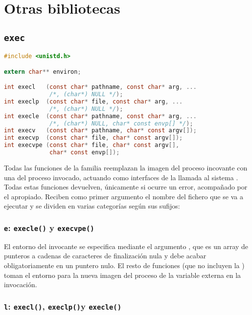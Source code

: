\chapter{Otras bibliotecas}

\section{\texttt{exec}}\label{exec}

\begin{lstlisting}[language=C]
#include <unistd.h>

extern char** environ;

int execl   (const char* pathname, const char* arg, ...
             /*, (char*) NULL */);
int execlp  (const char* file, const char* arg, ...
             /*, (char*) NULL */);
int execle  (const char* pathname, const char* arg, ...
             /*, (char*) NULL, char* const envp[] */);
int execv   (const char* pathname, char* const argv[]);
int execvp  (const char* file, char* const argv[]);
int execvpe (const char* file, char* const argv[],
             char* const envp[]);
\end{lstlisting}

Todas las funciones de la familia  reemplazan la imagen del proceso incovante con una del proceso invocado, actuando como interfaces de la llamada al sistema .
Todas estas funciones devuelven, únicamente si ocurre un error,  acompañado por el  apropiado.
Reciben como primer argumento el nombre del fichero que se va a ejecutar y se dividen en varias categorías según sus sufijos:

\subsection{\texttt{e}: \texttt{execle()} y \texttt{execvpe()}}

El entorno del invocante se especifica mediante el argumento , que es un array de punteros a cadenas de caracteres de finalización nula y debe acabar obligatoriamente en un puntero nulo.
El resto de funciones  (que no incluyen la ) toman el entorno para la nueva imagen del proceso de la variable externa  en la invocación.

\subsection{\texttt{l}: \texttt{execl()}, \texttt{execlp()}y \texttt{execle()}}

